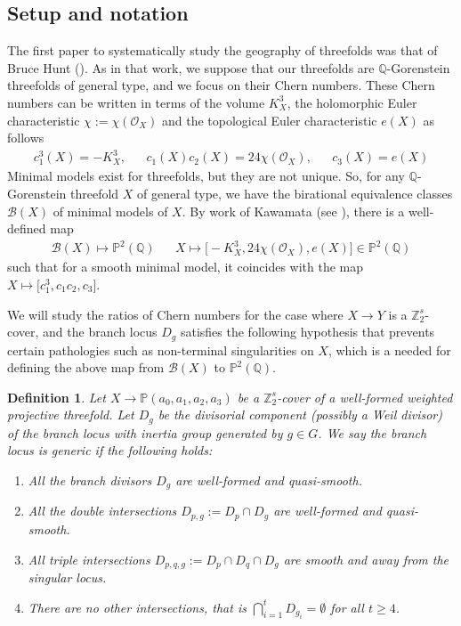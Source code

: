 \documentclass[12pt,twoside,]{amsart}
\theoremstyle{plain}
\newtheorem{definition}[theorem]{Definition}
\theoremstyle{definition}
\begin{document}
\subsection{Setup and notation}\label{sec:set-up}
The first paper to systematically study the geography of threefolds was that of Bruce Hunt (\cite{huntthreefolds89}).
As in that work, we suppose that our threefolds are $\mathbb{Q}$-Gorenstein threefolds of general type, and we focus on their Chern numbers. These Chern numbers can be written in terms of the volume $K_X^3$, the holomorphic Euler characteristic 
$\chi:=\chi(\mathcal{O}_X)$ and the topological Euler characteristic $e(X)$ as follows
\begin{align*}
c_1^3(X) = -K_X^3,
&&
c_1(X)c_2(X) = 24 \chi( \mathcal{O}_X),
&&
c_3(X) = e(X)
\end{align*}
Minimal models exist for threefolds, but they are not unique. So, for any $\mathbb{Q}$-Gorenstein threefold $X$ of general type, we have the birational equivalence classes $\mathcal{B}(X)$ of minimal models of $X$. By work of Kawamata (see \cite[Section $7.1.2$]{huntthreefolds89}), there is a well-defined map 
\begin{align*}
\mathcal{B}(X) \mapsto  \mathbb{P}^2(\mathbb{Q})
&&
X \mapsto \big[ 
-K_X^3  , 24\chi(\mathcal{O}_X), 
e(X)
\big] \in \mathbb{P}^2(\mathbb{Q})
\end{align*}
such that for a smooth minimal model, it coincides with the map 
\(
X \mapsto \big[c_1^3 , c_1c_2, c_3 \big].
\)

We will study the ratios of Chern numbers for the case  where
$X \rightarrow Y$ is a $\mathbb{Z}_2^s$-cover, and the branch locus $D_g$ satisfies the following hypothesis that prevents certain pathologies such as non-terminal singularities on $X$, which is a needed for defining the above map from $\mathcal{B}(X)$ to 
$\mathbb{P}^2(\mathbb{Q})$.
\begin{definition}
\label{def:divisor_standard set-up}
Let $X \rightarrow \mathbb{P}(a_0, a_1, a_2, a_3)$ be a 
$\mathbb{Z}^s_2$-cover of a well-formed weighted projective threefold. Let $D_g$ be the divisorial component (possibly a Weil divisor) of the branch locus with inertia group generated by $g \in G$. We say the branch locus is generic if the following holds:
\begin{enumerate}
\item All the branch divisors $D_g$ are well-formed and quasi-smooth.
\item All the double intersections $D_{p, g} := D_{p} \cap D_{g}$ are well-formed and quasi-smooth.
    \item All triple intersections 
    $D_{p,q,g} := D_{p} \cap D_{q} \cap D_{g}$ are smooth and away from the singular locus.
    \item There are no other intersections, that is $\bigcap_{i = 1}^t D_{g_i} = \emptyset$ for all $t \geq 4$.
\end{enumerate}
\end{definition}
\end{document}

